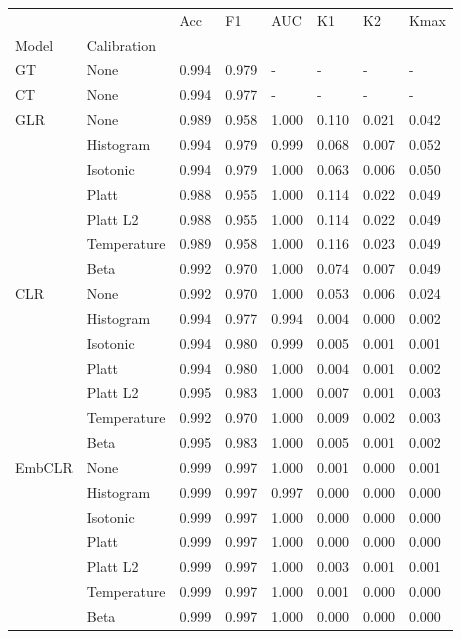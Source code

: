 \begin{tabular}{llllllll}
\toprule
 &  & Acc & F1 & AUC & K1 & K2 & Kmax \\
Model & Calibration &  &  &  &  &  &  \\
\midrule
GT & None & 0.994 & 0.979 & - & - & - & - \\
\cline{1-8}
CT & None & 0.994 & 0.977 & - & - & - & - \\
\cline{1-8}
\multirow[t]{7}{*}{GLR} & None & 0.989 & 0.958 & 1.000 & 0.110 & 0.021 & 0.042 \\
 & Histogram & 0.994 & 0.979 & 0.999 & 0.068 & 0.007 & 0.052 \\
 & Isotonic & 0.994 & 0.979 & 1.000 & 0.063 & 0.006 & 0.050 \\
 & Platt & 0.988 & 0.955 & 1.000 & 0.114 & 0.022 & 0.049 \\
 & Platt L2 & 0.988 & 0.955 & 1.000 & 0.114 & 0.022 & 0.049 \\
 & Temperature & 0.989 & 0.958 & 1.000 & 0.116 & 0.023 & 0.049 \\
 & Beta & 0.992 & 0.970 & 1.000 & 0.074 & 0.007 & 0.049 \\
\cline{1-8}
\multirow[t]{7}{*}{CLR} & None & 0.992 & 0.970 & 1.000 & 0.053 & 0.006 & 0.024 \\
 & Histogram & 0.994 & 0.977 & 0.994 & 0.004 & 0.000 & 0.002 \\
 & Isotonic & 0.994 & 0.980 & 0.999 & 0.005 & 0.001 & 0.001 \\
 & Platt & 0.994 & 0.980 & 1.000 & 0.004 & 0.001 & 0.002 \\
 & Platt L2 & 0.995 & 0.983 & 1.000 & 0.007 & 0.001 & 0.003 \\
 & Temperature & 0.992 & 0.970 & 1.000 & 0.009 & 0.002 & 0.003 \\
 & Beta & 0.995 & 0.983 & 1.000 & 0.005 & 0.001 & 0.002 \\
\cline{1-8}
\multirow[t]{7}{*}{EmbCLR} & None & 0.999 & 0.997 & 1.000 & 0.001 & 0.000 & 0.001 \\
 & Histogram & 0.999 & 0.997 & 0.997 & 0.000 & 0.000 & 0.000 \\
 & Isotonic & 0.999 & 0.997 & 1.000 & 0.000 & 0.000 & 0.000 \\
 & Platt & 0.999 & 0.997 & 1.000 & 0.000 & 0.000 & 0.000 \\
 & Platt L2 & 0.999 & 0.997 & 1.000 & 0.003 & 0.001 & 0.001 \\
 & Temperature & 0.999 & 0.997 & 1.000 & 0.001 & 0.000 & 0.000 \\
 & Beta & 0.999 & 0.997 & 1.000 & 0.000 & 0.000 & 0.000 \\
\cline{1-8}
\bottomrule
\end{tabular}

